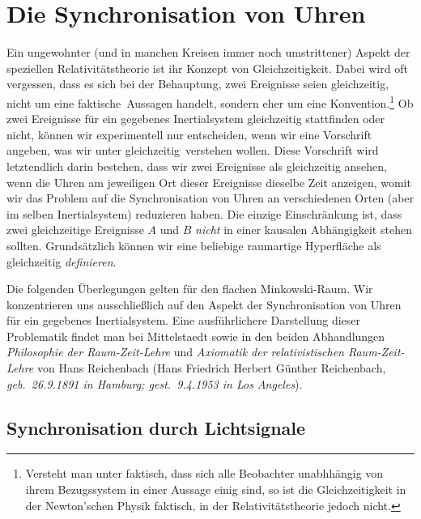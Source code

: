 \section{Die Synchronisation von Uhren}
\label{sec_Synch}

Ein ungewohnter (und in manchen Kreisen immer noch umstrittener) Aspekt der speziellen
Relativit\"atstheorie ist ihr Konzept von Gleichzeitigkeit. 
Dabei wird
oft vergessen, dass es sich bei der Behauptung, zwei 
Ereignisse seien gleichzeitig, nicht um eine
\glqq faktische\grqq\ Aussagen handelt, sondern 
eher um eine Konvention.\footnote{Versteht man unter \glqq faktisch\grqq, dass
sich alle Beobachter unabhh\"angig von ihrem Bezugssystem in einer Aussage
einig sind, so ist die Gleichzeitigkeit in der Newton'schen Physik faktisch, in der
Relativit\"atstheorie jedoch nicht.}
Ob zwei Ereignisse f\"ur ein gegebenes Inertialsys\-tem gleichzeitig
stattfinden oder
nicht, k\"onnen wir experimentell nur entscheiden, wenn wir eine
Vorschrift angeben, was wir unter \glqq gleichzeitig\grqq\ verstehen
wollen. Diese Vorschrift wird letztendlich darin bestehen, dass wir
zwei Ereignisse als gleichzeitig ansehen, wenn die Uhren
am jeweiligen Ort dieser Ereignisse dieselbe Zeit anzeigen, womit wir das
Problem auf die Synchronisation von Uhren an verschiedenen
Orten (aber im selben Inertialsystem) reduzieren haben. 
Die einzige Einschr\"ankung ist, dass zwei gleichzeitige 
Ereignisse $A$ und $B$ {\em nicht} in einer kausalen Abh\"angigkeit stehen 
sollten. Grunds\"atzlich k\"onnen wir
eine beliebige raumartige Hyperfl\"ache als gleichzeitig {\em definieren}.

Die folgenden \"Uberlegungen gelten f\"ur den flachen Minkowski-Raum.
Wir konzentrieren uns ausschlie\ss lich auf den Aspekt der
Synchronisation 
von Uhren f\"ur ein gegebenes Inertialsystem. Eine
ausf\"uhrlichere Darstellung dieser Problematik findet man bei 
Mittelstaedt \cite{Mittelstaedt} sowie in den beiden Abhandlungen
{\em Philosophie der Raum-Zeit-Lehre} \cite{Reichenbach1} und 
{\em Axiomatik der relativistischen Raum-Zeit-Lehre} \cite{Reichenbach2}
von Hans Reichenbach 
(Hans Friedrich Herbert G\"unther Reichenbach,
{\em geb.\ 26.9.1891 in Hamburg; gest.\ 9.4.1953 in Los Angeles}). 

\subsection{Synchronisation durch Lichtsignale}

